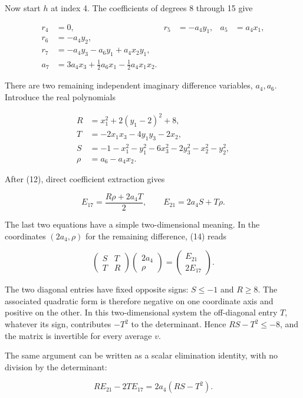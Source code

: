 Now start \(h\) at index 4. The coefficients of degrees 8 through 15
give

\[
\begin{aligned}
r_4&=0,& r_5&=-a_4y_1,&a_5&=a_4x_1,\\
r_6&=-a_4y_2,\\
r_7&=-a_4y_3-a_6y_1+a_4x_2y_1,\\
a_7&=3a_4x_3+\tfrac12a_6x_1-\tfrac12a_4x_1x_2.
\end{aligned}\tag{12}
\]

There are two remaining independent imaginary difference variables,
\(a_4,a_6\). Introduce the real polynomials

\[
\begin{aligned}
R&=x_1^2+2(y_1-2)^2+8,\\
T&=-2x_1x_3-4y_1y_3-2x_2,\\
S&=-1-x_1^2-y_1^2-6x_3^2-2y_3^2-x_2^2-y_2^2,\\
\rho&=a_6-a_4x_2.
\end{aligned}\tag{13}
\]

After (12), direct coefficient extraction gives

\[
E_{17}=\frac{R\rho+2a_4T}{2},\qquad
E_{21}=2a_4S+T\rho. \tag{14}
\]

The last two equations have a simple two-dimensional meaning. In the
coordinates \((2a_4,\rho)\) for the remaining difference, (14) reads

\[
\begin{pmatrix} S&T\\ T&R\end{pmatrix}
\begin{pmatrix}2a_4\\ \rho\end{pmatrix}
=\begin{pmatrix}E_{21}\\2E_{17}\end{pmatrix}.
\]

The two diagonal entries have fixed opposite signs: \(S\le-1\) and
\(R\ge8\). The associated quadratic form is therefore negative on one
coordinate axis and positive on the other. In this two-dimensional
system the off-diagonal entry \(T\), whatever its sign, contributes
\(-T^2\) to the determinant. Hence \(RS-T^2\le-8\), and the matrix is
invertible for every average \(v\).

The same argument can be written as a scalar elimination identity, with
no division by the determinant:

\[
\boxed{R E_{21}-2T E_{17}=2a_4(RS-T^2).}\tag{15}
\]


